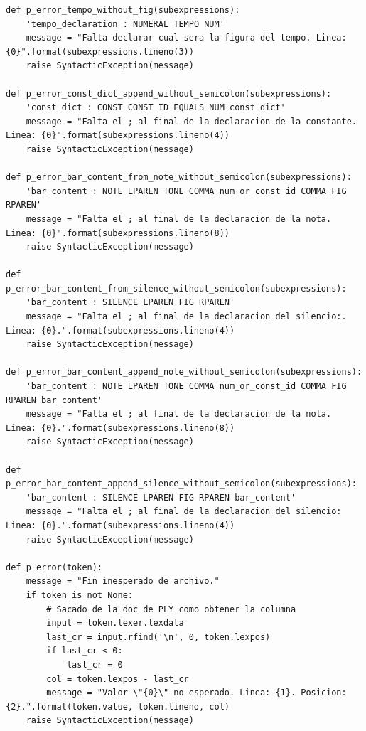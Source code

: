\documentclass[a4paper, 10pt, twoside]{article}
\begin{document}
\begin{verbatim}
def p_error_tempo_without_fig(subexpressions):
    'tempo_declaration : NUMERAL TEMPO NUM'
    message = "Falta declarar cual sera la figura del tempo. Linea: {0}".format(subexpressions.lineno(3))
    raise SyntacticException(message)
    
def p_error_const_dict_append_without_semicolon(subexpressions):
    'const_dict : CONST CONST_ID EQUALS NUM const_dict'
    message = "Falta el ; al final de la declaracion de la constante. Linea: {0}".format(subexpressions.lineno(4))
    raise SyntacticException(message)
    
def p_error_bar_content_from_note_without_semicolon(subexpressions):
    'bar_content : NOTE LPAREN TONE COMMA num_or_const_id COMMA FIG RPAREN'
    message = "Falta el ; al final de la declaracion de la nota. Linea: {0}".format(subexpressions.lineno(8))
    raise SyntacticException(message)
    
def p_error_bar_content_from_silence_without_semicolon(subexpressions):
    'bar_content : SILENCE LPAREN FIG RPAREN'
    message = "Falta el ; al final de la declaracion del silencio:. Linea: {0}.".format(subexpressions.lineno(4))
    raise SyntacticException(message)

def p_error_bar_content_append_note_without_semicolon(subexpressions):
    'bar_content : NOTE LPAREN TONE COMMA num_or_const_id COMMA FIG RPAREN bar_content'
    message = "Falta el ; al final de la declaracion de la nota. Linea: {0}.".format(subexpressions.lineno(8))
    raise SyntacticException(message)

def p_error_bar_content_append_silence_without_semicolon(subexpressions):
    'bar_content : SILENCE LPAREN FIG RPAREN bar_content'
    message = "Falta el ; al final de la declaracion del silencio: Linea: {0}.".format(subexpressions.lineno(4))
    raise SyntacticException(message)
    
def p_error(token):
    message = "Fin inesperado de archivo."
    if token is not None:
        # Sacado de la doc de PLY como obtener la columna
        input = token.lexer.lexdata
        last_cr = input.rfind('\n', 0, token.lexpos)
        if last_cr < 0:
            last_cr = 0    
        col = token.lexpos - last_cr
        message = "Valor \"{0}\" no esperado. Linea: {1}. Posicion: {2}.".format(token.value, token.lineno, col)
    raise SyntacticException(message)
\end{verbatim}
\end{document}
